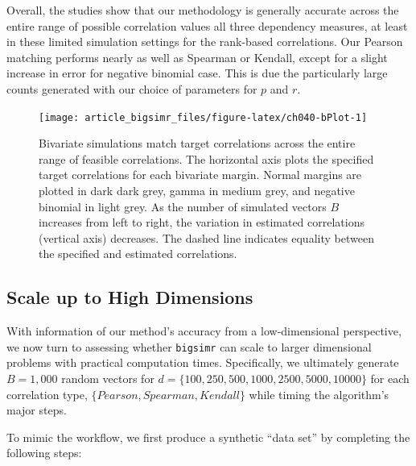 \documentclass[
]{jss}
\begin{document}
Overall, the studies show that our methodology is generally accurate
across the entire range of possible correlation values all three
dependency measures, at least in these limited simulation settings for
the rank-based correlations. Our Pearson matching performs nearly as
well as Spearman or Kendall, except for a slight increase in error for
negative binomial case. This is due the particularly large counts
generated with our choice of parameters for \(p\) and \(r\).

\begin{CodeChunk}
\begin{figure}

{\centering \texttt{[image: article\_bigsimr\_files/figure-latex/ch040-bPlot-1]} 

}

\caption[Bivariate simulations match target correlations across the entire range of feasible correlations]{Bivariate simulations match target correlations across the entire range of feasible correlations. The horizontal axis plots the specified target correlations for each bivariate margin. Normal margins are plotted in dark dark grey, gamma in medium grey, and negative binomial in light grey. As the number of simulated vectors $B$ increases from left to right, the variation in estimated correlations (vertical axis) decreases. The dashed line indicates equality between the specified and estimated correlations.}\label{fig:ch040-bPlot}
\end{figure}
\end{CodeChunk}

\hypertarget{scale-up-to-high-dimensions}{%
\subsection{Scale up to High
Dimensions}\label{scale-up-to-high-dimensions}}

With information of our method's accuracy from a low-dimensional
perspective, we now turn to assessing whether \texttt{bigsimr} can scale
to larger dimensional problems with practical computation times.
Specifically, we ultimately generate \(B=1,000\) random vectors for
\(d=\{100, 250, 500, 1000, 2500, 5000, 10000\}\) for each correlation
type, \(\{Pearson, Spearman, Kendall\}\) while timing the algorithm's
major steps.

To mimic the workflow, we first produce a synthetic ``data set'' by
completing the following steps:

\end{document}
